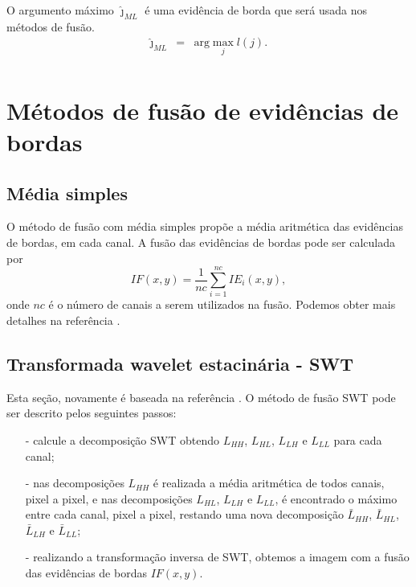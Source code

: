 \documentclass[conference]{IEEEtran}
\begin{document}
O argumento máximo  $\widehat{\jmath}_{ML}$ é uma evidência de borda que será usada nos métodos de fusão.
\begin{equation*}
\begin{array}{rcl}
	\widehat{\jmath}_{ML}&=&\text{arg}\max\limits_{j}l(j).  \\
\end{array}
\end{equation*}
\section{Métodos de fusão de evidências de bordas}\label{sec_06}
\subsection{Média simples}
O método de fusão com média simples propõe a média aritmética das evidências de bordas, em cada canal. A fusão das evidências de bordas pode ser calculada por
\begin{equation}
	IF(x,y)=\frac{1}{nc}\sum_{i=1}^{nc}IE_i(x,y),
\end{equation}
onde $nc$ é o número de canais a serem utilizados na fusão. Podemos obter mais detalhes na referência \cite{mit}.
\subsection{Transformada wavelet estacinária - SWT} Esta seção, novamente é baseada na referência \cite{n_r}. O método de fusão SWT pode ser descrito pelos seguintes passos:
\begin{itemize}
\item[-] calcule a decomposição SWT obtendo $L_{HH}$, $L_{HL}$, $L_{LH}$ e $L_{LL}$ para cada canal;
\item[-] nas decomposições $L_{HH}$ é realizada a média aritmética de todos canais, pixel a pixel, e nas decomposições $L_{HL}$, $L_{LH}$ e $L_{LL}$, é encontrado o máximo entre cada canal, pixel a pixel, restando uma nova decomposição $\bar{L}_{HH}$, $\bar{L}_{HL}$, $\bar{L}_{LH}$ e $\bar{L}_{LL}$;
\item[-] realizando a transformação inversa de SWT, obtemos a imagem com a fusão das evidências de bordas $IF(x,y)$.  
\end{itemize}
\end{document}
